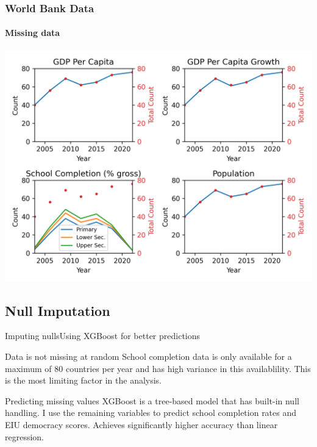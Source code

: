 \documentclass[10pt]{beamer}
\begin{document}
\begin{frame}
    \frametitle{World Bank Data}
    \framesubtitle{Missing data}
    \centering
    \includegraphics[width=\textwidth]{../charts/wdi-count.png}
\end{frame}

\subsection{Null Imputation}
\begin{frame}{Imputing nulls}{Using XGBoost for better predictions}
    \begin{block}{Data is not missing at random}
        School completion data is only available for a maximum of 80 countries per year and has high variance in this availablility.
        This is the most limiting factor in the analysis.
    \end{block}

    \begin{block}{Predicting missing values}
        XGBoost is a tree-based model that has built-in null handling. I use the remaining variables to predict school completion rates and EIU democracy scores.
        Achieves significantly higher accuracy than linear regression.
    \end{block}
    
\end{frame}
\end{document}
